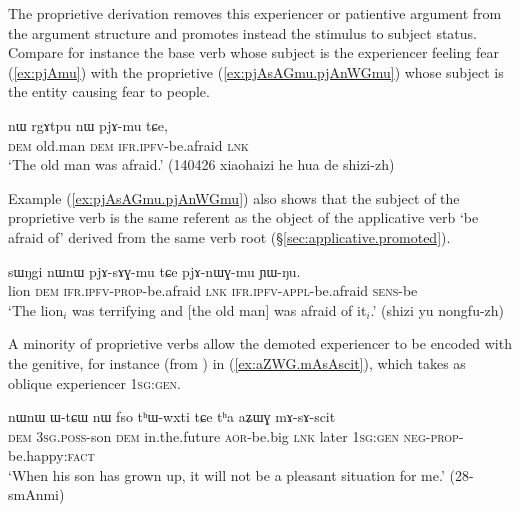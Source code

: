 The proprietive derivation removes this experiencer or patientive argument from the argument structure and promotes instead the stimulus to subject status. Compare for instance the base verb  whose subject is the experiencer feeling fear (\ref{ex:pjAmu}) with the proprietive  (\ref{ex:pjAsAGmu.pjAnWGmu}) whose subject is the entity causing fear to people. 


\begin{exe}
\ex \label{ex:pjAmu}
\gll nɯ rgɤtpu nɯ pjɤ-mu tɕe, \\
\textsc{dem} old.man \textsc{dem} \textsc{ifr}.\textsc{ipfv}-be.afraid \textsc{lnk} \\
\glt `The old man was afraid.' (140426 xiaohaizi he hua de shizi-zh)
\end{exe}


Example (\ref{ex:pjAsAGmu.pjAnWGmu}) also shows that the subject of the proprietive verb  is the same referent as the object of the applicative verb  `be afraid of' derived from the same verb root (§\ref{sec:applicative.promoted}).

\begin{exe}
\ex \label{ex:pjAsAGmu.pjAnWGmu}
\gll sɯŋgi nɯnɯ pjɤ-sɤɣ-mu tɕe pjɤ-nɯɣ-mu ɲɯ-ŋu.\\
lion \textsc{dem} \textsc{ifr}.\textsc{ipfv}-\textsc{prop}-be.afraid \textsc{lnk} \textsc{ifr}.\textsc{ipfv}-\textsc{appl}-be.afraid \textsc{sens}-be \\
\glt `The lion$_i$ was terrifying and [the old man] was afraid of it$_i$.' (shizi yu nongfu-zh)
\end{exe}


A minority of proprietive verbs allow the demoted experiencer to be encoded with the genitive, for instance  (from ) in (\ref{ex:aZWG.mAsAscit}), which takes as oblique experiencer  \textsc{1sg}:\textsc{gen}.

\begin{exe}
\ex \label{ex:aZWG.mAsAscit}
\gll  nɯnɯ ɯ-tɕɯ nɯ fso tʰɯ-wxti tɕe tʰa aʑɯɣ mɤ-sɤ-scit \\
\textsc{dem} \textsc{3sg}.\textsc{poss}-son \textsc{dem} in.the.future \textsc{aor}-be.big \textsc{lnk} later \textsc{1sg}:\textsc{gen} \textsc{neg}-\textsc{prop}-be.happy:\textsc{fact} \\
\glt `When his son has grown up, it will not be a pleasant situation for me.' (28-smAnmi)
\end{exe}
 

